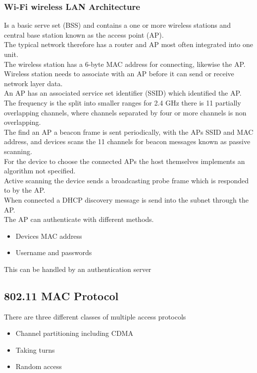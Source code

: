 \documentclass[12pt, a4paper]{article}
\begin{document}
		\subsubsection{Wi-Fi wireless LAN Architecture}
			Is a basic serve set (BSS) and contains a one or more wireless stations and central base station known as the access point (AP).\\
			The typical network therefore has a router and AP most often integrated into one unit.\\
			The wireless station has a 6-byte MAC address for connecting, likewise the AP.\\
			Wireless station needs to associate with an AP before it can send or receive network layer data.\\
			An AP has an associated service set identifier (SSID) which identified the AP.\\
			The frequency is the split into smaller ranges for 2.4 GHz there is 11 partially overlapping channels, where channels separated by four or more channels is non overlapping.\\
			The find an AP a beacon frame is sent periodically, with the APs SSID and MAC address, and devices scans the 11 channels for beacon messages known as passive scanning.\\
			For the device to choose the connected APs the host themselves implements an algorithm not specified.\\
			Active scanning the device sends a broadcasting probe frame which is responded to by the AP.\\
			When connected a DHCP discovery message is send into the subnet through the AP.\\
			The AP can authenticate with different methods.\\
			\begin{itemize}
				\item Devices MAC address
				\item Username and passwords
			\end{itemize}
			This can be handled by an authentication server 
	\subsection{802.11 MAC Protocol}
		There are three different classes of multiple access protocols
		\begin{itemize}
			\item Channel partitioning including CDMA
			\item Taking turns
			\item Random access
		\end{itemize}
\end{document}
